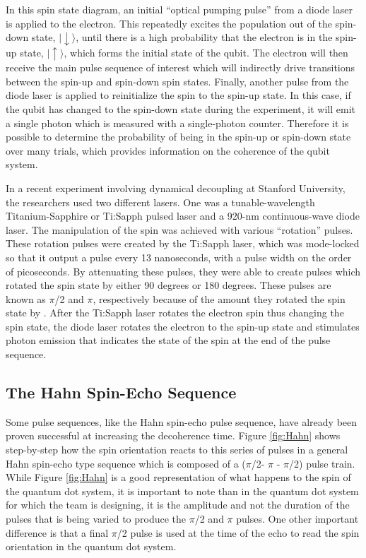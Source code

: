 \documentclass[pdftex,12pt,a4paper]{article}
\begin{document}
In this spin state diagram, an initial “optical pumping pulse” from a diode laser is applied to the electron. This repeatedly excites the population out of the spin-down state, $|\downarrow\rangle$, until there is a high probability that the electron is in the spin-up state, $|\uparrow\rangle$, which forms the initial state of the qubit. The electron will then receive the main pulse sequence of interest which will indirectly drive transitions between the spin-up and spin-down spin states. Finally, another pulse from the diode laser is applied to reinitialize the spin to the spin-up state. In this case, if the qubit has changed to the spin-down state during the experiment, it will emit a single photon which is measured with a single-photon counter. Therefore it is possible to determine the probability of being in the spin-up or spin-down state over many trials, which provides information on the coherence of the qubit system.


In a recent experiment involving dynamical decoupling at Stanford University, the researchers used two different lasers. One was a tunable-wavelength Titanium-Sapphire or Ti:Sapph pulsed laser and a 920-nm continuous-wave diode laser. The manipulation of the spin was achieved with various “rotation” pulses. These rotation pulses were created by the Ti:Sapph laser, which was mode-locked so that it output a pulse every 13 nanoseconds, with a pulse width on the order of picoseconds. By attenuating these pulses, they were able to create pulses which rotated the spin state by either 90 degrees or 180 degrees. These pulses are known as  $\pi$/2 and $\pi$, respectively because of the amount they rotated the spin state by \cite{Nuclear_Feedback}. After the Ti:Sapph laser rotates the electron spin thus changing the spin state, the diode laser rotates the electron to the spin-up state and stimulates photon emission that indicates the state of the spin at the end of the pulse sequence. 


\subsection{The Hahn Spin-Echo Sequence}
Some pulse sequences, like the Hahn spin-echo pulse sequence, have already been proven successful at increasing the decoherence time. Figure \ref{fig:Hahn} shows step-by-step how the spin orientation reacts to this series of pulses in a general Hahn spin-echo type sequence which is composed of a ($\pi$/2- $\pi$ - $\pi$/2) pulse train. While Figure \ref{fig:Hahn} is a good representation of what happens to the spin of the quantum dot system, it is important to note than in the quantum dot system for which the team is designing, it is the amplitude and not the duration of the pulses that is being varied to produce the $\pi$/2 and $\pi$ pulses. One other important difference is that a final $\pi$/2 pulse is used at the time of the echo to read the spin orientation in the quantum dot system.
\end{document}
